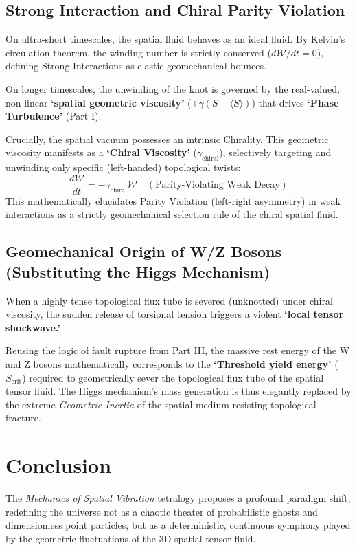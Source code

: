 \documentclass[reprint,amsmath,amssymb,aps,prd]{revtex4-2}
\begin{document}
\subsection{Strong Interaction and Chiral Parity Violation}
On ultra-short timescales, the spatial fluid behaves as an ideal fluid. By Kelvin's circulation theorem, the winding number is strictly conserved ($d\mathcal{W}/dt = 0$), defining Strong Interactions as elastic geomechanical bounces.

On longer timescales, the unwinding of the knot is governed by the real-valued, non-linear \textbf{`spatial geometric viscosity'} ($+\gamma(S - \langle S \rangle)$) that drives \textbf{`Phase Turbulence'} (Part I).

Crucially, the spatial vacuum possesses an intrinsic Chirality. This geometric viscosity manifests as a \textbf{`Chiral Viscosity'} ($\gamma_{\mathrm{chiral}}$), selectively targeting and unwinding only specific (left-handed) topological twists:
\begin{equation}
\frac{d\mathcal{W}}{dt} = -\gamma_{\mathrm{chiral}} \mathcal{W} \quad (\text{Parity-Violating Weak Decay})
\end{equation}
This mathematically elucidates Parity Violation (left-right asymmetry) \cite{Wu1957} in weak interactions as a strictly geomechanical selection rule of the chiral spatial fluid.

\subsection{Geomechanical Origin of W/Z Bosons (Substituting the Higgs Mechanism)}
When a highly tense topological flux tube is severed (unknotted) under chiral viscosity, the sudden release of torsional tension triggers a violent \textbf{`local tensor shockwave.'}

Reusing the logic of fault rupture from Part III, the massive rest energy of the W and Z bosons mathematically corresponds to the \textbf{`Threshold yield energy'} ($S_{\mathrm{crit}}$) required to geometrically sever the topological flux tube of the spatial tensor fluid. The Higgs mechanism's mass generation is thus elegantly replaced by the extreme \textit{Geometric Inertia} of the spatial medium resisting topological fracture.

\section{Conclusion}

The \textit{Mechanics of Spatial Vibration} tetralogy proposes a profound paradigm shift, redefining the universe not as a chaotic theater of probabilistic ghosts and dimensionless point particles, but as a deterministic, continuous symphony played by the geometric fluctuations of the 3D spatial tensor fluid.
\end{document}
